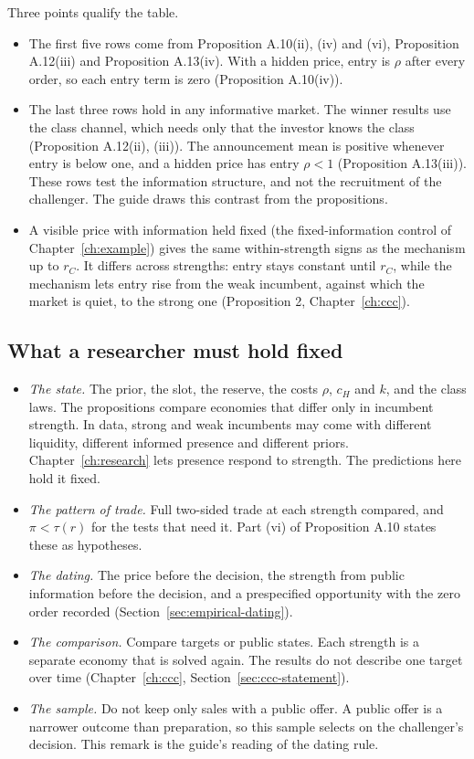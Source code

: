 Three points qualify the table.
\begin{itemize}
\item The first five rows come from Proposition A.10(ii), (iv) and (vi), Proposition A.12(iii) and Proposition A.13(iv). With a hidden price, entry is \(\rho\) after every order, so each entry term is zero (Proposition A.10(iv)).
\item The last three rows hold in any informative market. The winner results use the class channel, which needs only that the investor knows the class (Proposition A.12(ii), (iii)). The announcement mean is positive whenever entry is below one, and a hidden price has entry \(\rho<1\) (Proposition A.13(iii)). These rows test the information structure, and not the recruitment of the challenger. The guide draws this contrast from the propositions.
\item A visible price with information held fixed (the fixed-information control of Chapter~\ref{ch:example}) gives the same within-strength signs as the mechanism up to \(r_C\). It differs across strengths: entry stays constant until \(r_C\), while the mechanism lets entry rise from the weak incumbent, against which the market is quiet, to the strong one (Proposition 2, Chapter~\ref{ch:ccc}).
\end{itemize}

\subsection{What a researcher must hold fixed}

\begin{itemize}
\item \emph{The state.} The prior, the slot, the reserve, the costs \(\rho\), \(c_H\) and \(k\), and the class laws. The propositions compare economies that differ only in incumbent strength. In data, strong and weak incumbents may come with different liquidity, different informed presence and different priors. Chapter~\ref{ch:research} lets presence respond to strength. The predictions here hold it fixed.
\item \emph{The pattern of trade.} Full two-sided trade at each strength compared, and \(\pi<\tau(r)\) for the tests that need it. Part (vi) of Proposition A.10 states these as hypotheses.
\item \emph{The dating.} The price before the decision, the strength from public information before the decision, and a prespecified opportunity with the zero order recorded (Section~\ref{sec:empirical-dating}).
\item \emph{The comparison.} Compare targets or public states. Each strength is a separate economy that is solved again. The results do not describe one target over time (Chapter~\ref{ch:ccc}, Section~\ref{sec:ccc-statement}).
\item \emph{The sample.} Do not keep only sales with a public offer. A public offer is a narrower outcome than preparation, so this sample selects on the challenger's decision. This remark is the guide's reading of the dating rule.
\end{itemize}

